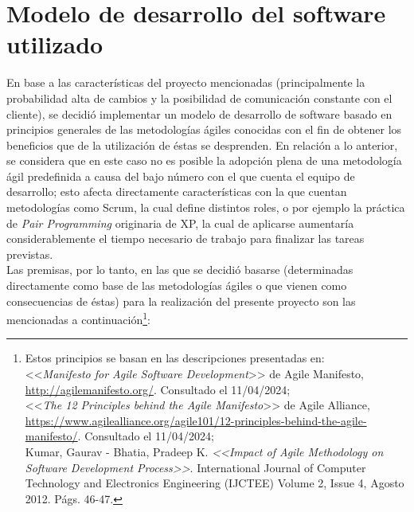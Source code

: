 \documentclass[a4paper, 12pt,twoside]{report}  %
\numberwithin{equation}{subsection} %
\begin{document}
\section{Modelo de desarrollo del software utilizado}
\label{Modelo de desarrollo del software utilizado}
En base a las características del proyecto mencionadas (principalmente la probabilidad alta de cambios y la posibilidad de comunicación constante con el cliente), se decidió implementar un modelo de desarrollo de software basado en principios generales de las metodologías ágiles conocidas con el fin de obtener los beneficios que de la utilización de éstas se desprenden. En relación a lo anterior, se considera que en este caso no es posible la adopción plena de una metodología ágil predefinida a causa del bajo número con el que cuenta el equipo de desarrollo; esto afecta directamente características con la que cuentan metodologías como Scrum, la cual define distintos roles, o por ejemplo la práctica de \textit{Pair Programming} originaria de XP, la cual de aplicarse aumentaría considerablemente el tiempo necesario de trabajo para finalizar las tareas previstas.\\
\indent Las premisas, por lo tanto, en las que se decidió basarse (determinadas directamente como base de las metodologías ágiles o que vienen como consecuencias de éstas) para la realización del presente proyecto son las mencionadas a continuación\footnote{Estos principios se basan en las descripciones presentadas en:\\ \indent <<\textit{Manifesto for Agile Software Development}>> de Agile Manifesto, \url{http://agilemanifesto.org/}. Consultado el 11/04/2024;\\ \indent <<\textit{The 12 Principles behind the Agile Manifesto}>> de Agile Alliance, \url{https://www.agilealliance.org/agile101/12-principles-behind-the-agile-manifesto/}. Consultado el 11/04/2024;\\
	\indent Kumar, Gaurav - Bhatia, Pradeep K. \textit{<<Impact of Agile Methodology on Software Development Process>>}. International Journal of Computer Technology and Electronics Engineering (IJCTEE)
	Volume 2, Issue 4, Agosto 2012. Págs. 46-47.}:
\end{document}
